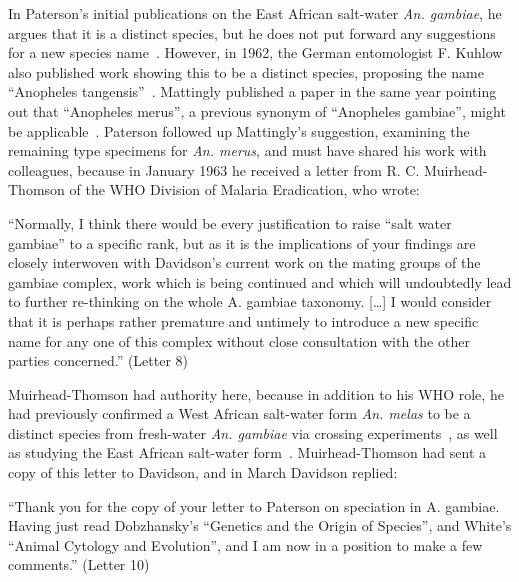 \begin{refsection}
In Paterson's initial publications on the East African salt-water \textit{An. gambiae}, he argues that it is a distinct species, but he does not put forward any suggestions for a new species name~\parencite{Paterson1962a,Paterson1962b}.
%
However, in 1962, the German entomologist F. Kuhlow also published work showing this to be a distinct species, proposing the name ``Anopheles tangensis''~\parencite{Kuhlow1962}.
%
Mattingly published a paper in the same year pointing out that ``Anopheles merus'', a previous synonym of ``Anopheles gambiae'', might be applicable~\parencite{Mattingly1962}.
%
Paterson followed up Mattingly's suggestion, examining the remaining type specimens for \textit{An. merus}, and must have shared his work with colleagues, because in January 1963 he received a letter from R. C. Muirhead-Thomson of the WHO Division of Malaria Eradication, who wrote:


\begin{displayquote}
``Normally, I think there would be every justification to raise ``salt water gambiae'' to a specific rank, but as it is the implications of your findings are closely interwoven with Davidson's current work on the mating groups of the gambiae complex, work which is being continued and which will undoubtedly lead to further re-thinking on the whole A. gambiae taxonomy. [\ldots] I would consider that it is perhaps rather premature and untimely to introduce a new specific name for any one of this complex without close consultation with the other parties concerned.'' (Letter 8)
\end{displayquote}


Muirhead-Thomson had authority here, because in addition to his WHO role, he had previously confirmed a West African salt-water form \textit{An. melas} to be a distinct species from fresh-water \textit{An. gambiae} via crossing experiments~\parencite{MuirheadThomson1948}, as well as studying the East African salt-water form~\parencite{MuirheadThomson1951}.
%
Muirhead-Thomson had sent a copy of this letter to Davidson, and in March Davidson replied:


\begin{displayquote}
``Thank you for the copy of your letter to Paterson on speciation in A. gambiae. Having just read Dobzhansky's ``Genetics and the Origin of Species'', and White's ``Animal Cytology and Evolution'', and I am now in a position to make a few comments.'' (Letter 10)
\end{displayquote}


\end{refsection}
